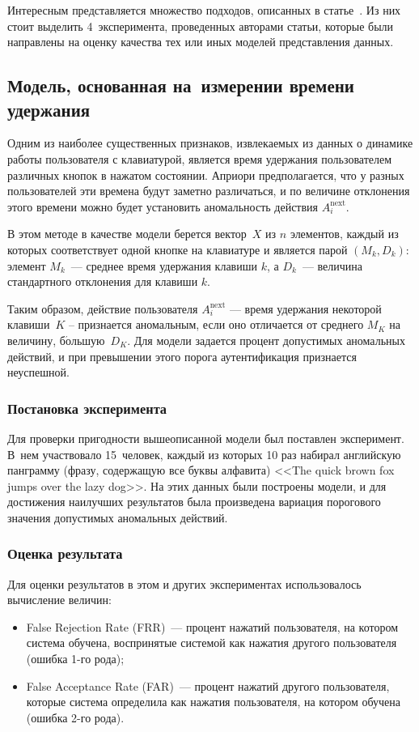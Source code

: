 \begin{multicols}{2}
Интересным представляется множество подходов, описанных в статье~\cite{lao}. 
Из них стоит выделить 4~эксперимента, проведенных
авторами статьи, которые были направлены на оценку качества тех или
иных моделей представления данных.

\subsection{Модель, основанная на~измерении времени удержания}\label{hold}

Одним из наиболее существенных признаков, извлекаемых из данных о
динамике работы пользователя с клавиатурой, является время удержания
пользователем различных кнопок в нажатом состоянии. Априори
предполагается, что у разных пользователей эти времена будут заметно
различаться, и по величине отклонения этого времени можно будет
установить аномальность действия $A_i^{\mathrm{next}}$.

В этом методе в качестве модели берется вектор~$X$ из $n$ элементов,
каждый из которых соответствует одной кнопке на клавиатуре и
является парой $(M_k, D_k)$: элемент $M_k$~--- среднее время
удержания клавиши $k$, а $D_k$~--- величина стандартного отклонения
для клавиши $k$.

Таким образом, действие пользователя $A^{\mathrm{next}}_i$ --- время
удержания некоторой клавиши~$K$ -- признается аномальным, если оно
отличается от среднего $M_K$ на величину, б$\acute{\mbox{о}}$льшую~$D_K$. Для модели
задается процент допустимых аномальных действий, и при превышении
этого порога аутентификация признается неуспешной.

\subsubsection{Постановка эксперимента}
Для проверки пригодности вышеописанной модели был поставлен
эксперимент. В~нем участвовало 15~человек, каждый из которых 10 раз
набирал английскую панграмму (фразу, содержащую все буквы алфавита)
<<{\sf The quick brown fox jumps over the lazy dog}>>. На этих
данных были построены модели, и для достижения наилучших результатов
была произведена вариация порогового значения допустимых аномальных
действий.

\subsubsection{Оценка результата}\label{shortres}
Для оценки результатов в этом и других экспериментах использовалось
вычисление величин:
\begin{itemize}
    \item False Rejection Rate (FRR)~--- процент нажатий пользователя, на  котором система обучена, воспринятые системой как нажатия другого пользователя (ошибка 1-го рода);
    \item  False Acceptance Rate (FAR)~--- процент нажатий другого пользователя, которые система определила как нажатия пользователя, на котором обучена (ошибка 2-го рода).
\end{itemize}




\end{multicols}
